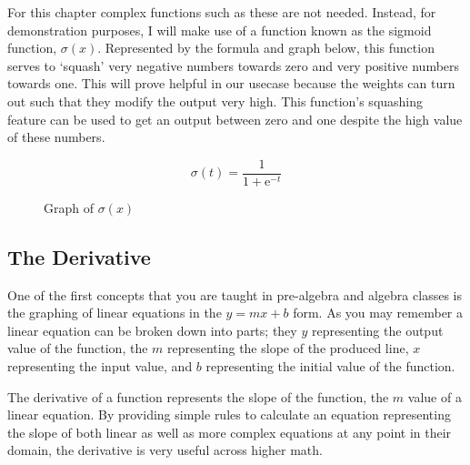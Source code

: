 \documentclass{memoir}
\newcommand{\e}{\text{e}}
\begin{document}
For this chapter complex functions such as these are not needed. Instead, for demonstration purposes, I will make use of a function known as the sigmoid function, \(\sigma (x)\). Represented by the formula and graph below, this function serves to `squash' very negative numbers towards zero and very positive numbers towards one. This will prove helpful in our usecase because the weights can turn out such that they modify the output very high. This function's squashing feature can be used to get an output between zero and one despite the high value of these numbers.

\begin{figure}[h]
	\centering
	\begin{minipage}{0.5\textwidth}
		\centering
		\[\sigma (t) = \frac{1}{1+\e^{-t}}\]
	\end{minipage}\hfill
	\begin{minipage}{0.5\textwidth}
		\centering
    \caption{Graph of $\sigma (x)$}
	\end{minipage}
\end{figure}
\subsection{The Derivative}
One of the first concepts that you are taught in pre-algebra and algebra classes is the graphing of linear equations in the \( y = mx + b\) form. As you may remember a linear equation can be broken down into parts; they $y$ representing the output value of the function, the $m$ representing the slope of the produced line, $x$ representing the input value, and $b$ representing the initial value of the function.

The derivative of a function represents the slope of the function, the $m$ value of a linear equation. By providing simple rules to calculate an equation representing the slope of both linear as well as more complex equations at any point in their domain, the derivative is very useful across higher math.
\end{document}
